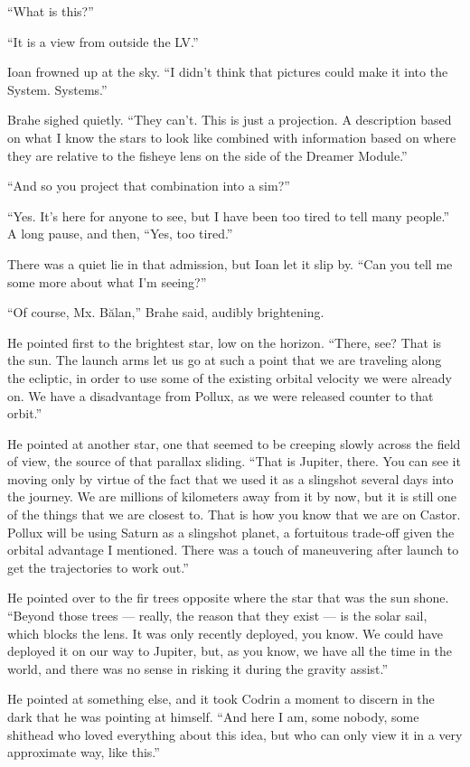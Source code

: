 ``What is this?''

``It is a view from outside the LV.''

Ioan frowned up at the sky. ``I didn't think that pictures could make it into the System. Systems.''

Brahe sighed quietly. ``They can't. This is just a projection. A description based on what I know the stars to look like combined with information based on where they are relative to the fisheye lens on the side of the Dreamer Module.''

``And so you project that combination into a sim?''

``Yes. It's here for anyone to see, but I have been too tired to tell many people.'' A long pause, and then, ``Yes, too tired.''

There was a quiet lie in that admission, but Ioan let it slip by. ``Can you tell me some more about what I'm seeing?''

``Of course, Mx. Bălan,'' Brahe said, audibly brightening.

He pointed first to the brightest star, low on the horizon. ``There, see? That is the sun. The launch arms let us go at such a point that we are traveling along the ecliptic, in order to use some of the existing orbital velocity we were already on. We have a disadvantage from Pollux, as we were released counter to that orbit.''

He pointed at another star, one that seemed to be creeping slowly across the field of view, the source of that parallax sliding. ``That is Jupiter, there. You can see it moving only by virtue of the fact that we used it as a slingshot several days into the journey. We are millions of kilometers away from it by now, but it is still one of the things that we are closest to. That is how you know that we are on Castor. Pollux will be using Saturn as a slingshot planet, a fortuitous trade-off given the orbital advantage I mentioned. There was a touch of maneuvering after launch to get the trajectories to work out.''

He pointed over to the fir trees opposite where the star that was the sun shone. ``Beyond those trees — really, the reason that they exist — is the solar sail, which blocks the lens. It was only recently deployed, you know. We could have deployed it on our way to Jupiter, but, as you know, we have all the time in the world, and there was no sense in risking it during the gravity assist.''

He pointed at something else, and it took Codrin a moment to discern in the dark that he was pointing at himself. ``And here I am, some nobody, some shithead who loved everything about this idea, but who can only view it in a very approximate way, like this.''


